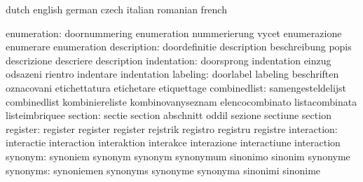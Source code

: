 
\startsetupvariables       dutch                     english
                           german                    czech
                           italian                   romanian
                           french

              enumeration: doornummering             enumeration
                           nummerierung              vycet
                           enumerazione              enumerare
                           enumeration
              description: doordefinitie             description
                           beschreibung              popis
                           descrizione               descriere
                           description
              indentation: doorsprong                indentation
                           einzug                    odsazeni
                           rientro                   indentare
                           indentation
                 labeling: doorlabel                 labeling
                           beschriften               oznacovani
                           etichettatura             etichetare
                           etiquettage
             combinedlist: samengesteldelijst        combinedlist
                           kombiniereliste           kombinovanyseznam
                           elencocombinato           listacombinata
                           listeimbriquee
                  section: sectie                    section
                           abschnitt                 oddil
                           sezione                   sectiune
                           section
                 register: register                  register
                           register                  rejstrik
                           registro                  registru
                           registre
              interaction: interactie                interaction
                           interaktion               interakce
                           interazione               interactiune
                           interaction
                  synonym: synoniem                  synonym
                           synonym                   synonymum
                           sinonimo                  sinonim
                           synonyme
                 synonyms: synoniemen                synonyms
                           synonyme                  synonyma
                           sinonimi                  sinonime
